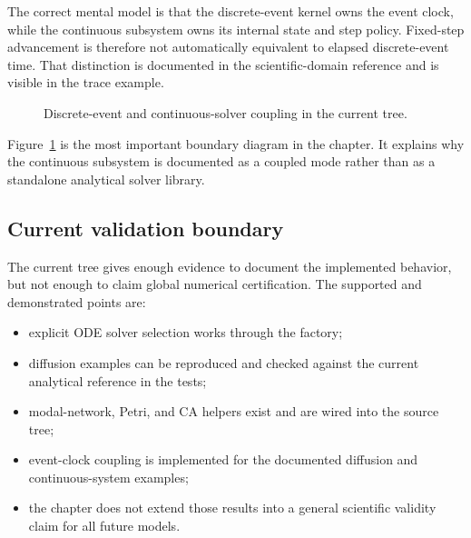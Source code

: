 The correct mental model is that the discrete-event kernel owns the event
clock, while the continuous subsystem owns its internal state and step policy.
Fixed-step advancement is therefore not automatically equivalent to elapsed
discrete-event time. That distinction is documented in the scientific-domain
reference and is visible in the trace example.

\begin{figure}[htbp]
\centering
\caption{Discrete-event and continuous-solver coupling in the current tree.}
\label{fig:hybrid-coupling-flow}
\end{figure}

Figure~\ref{fig:hybrid-coupling-flow} is the most important boundary diagram in
the chapter. It explains why the continuous subsystem is documented as a
coupled mode rather than as a standalone analytical solver library.

\subsection{Current validation boundary}
\label{subsec:current-validation-boundary}

The current tree gives enough evidence to document the implemented behavior,
but not enough to claim global numerical certification. The supported and
demonstrated points are:
\begin{itemize}
\item explicit ODE solver selection works through the factory;
\item diffusion examples can be reproduced and checked against the current
  analytical reference in the tests;
\item modal-network, Petri, and CA helpers exist and are wired into the source
  tree;
\item event-clock coupling is implemented for the documented diffusion and
  continuous-system examples;
\item the chapter does not extend those results into a general scientific
  validity claim for all future models.
\end{itemize}

